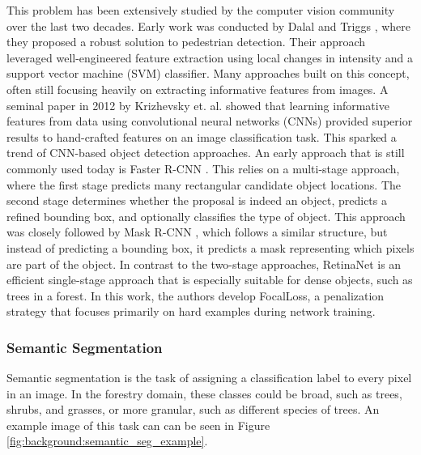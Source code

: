 This problem has been extensively studied by the computer vision community over the last two decades. Early work was conducted by Dalal and Triggs \cite{Dalal2005humanDetection}, where they proposed a robust solution to pedestrian detection. Their approach leveraged well-engineered feature extraction using local changes in intensity and a support vector machine (SVM) classifier. Many approaches built on this concept, often still focusing heavily on extracting informative features from images. A seminal paper in 2012 by Krizhevsky et. al. \cite{NIPS2012_c399862d} showed that learning informative features from data using convolutional neural networks (CNNs) provided superior results to hand-crafted features on an image classification task. This sparked a trend of CNN-based object detection approaches. An early approach that is still commonly used today is Faster R-CNN \cite{Ren2017FasterNetworks}. This relies on a multi-stage approach, where the first stage predicts many rectangular candidate object locations. The second stage determines whether the proposal is indeed an object, predicts a refined bounding box, and optionally classifies the type of object. This approach was closely followed by Mask R-CNN \cite{He2017MaskR-CNN}, which follows a similar structure, but instead of predicting a bounding box, it predicts a mask representing which pixels are part of the object. In contrast to the two-stage approaches, RetinaNet \cite{Lin2020FocalDetection} is an efficient single-stage approach that is especially suitable for dense objects, such as trees in a forest. In this work, the authors develop FocalLoss, a penalization strategy that focuses primarily on hard examples during network training.

\subsubsection{Semantic Segmentation}
Semantic segmentation is the task of assigning a classification label to every pixel in an image. In the forestry domain, these classes could be broad, such as trees, shrubs, and grasses, or more granular, such as different species of trees. An example image of this task can can be seen in Figure \ref{fig:background:semantic_seg_example}.

